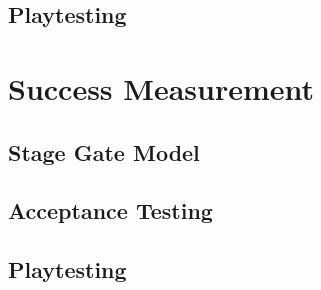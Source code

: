 \subsection{Playtesting}



\section{Success Measurement}

\subsection{Stage Gate Model}

\subsection{Acceptance Testing}

\subsection{Playtesting}
